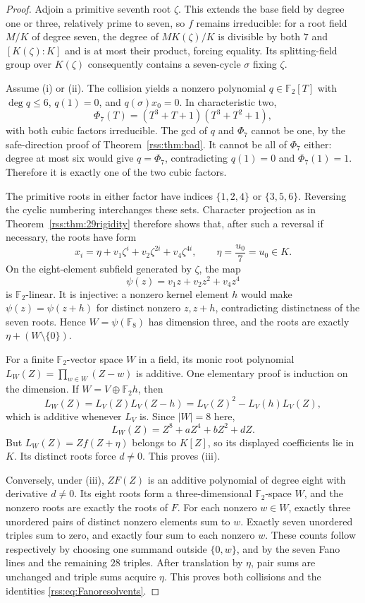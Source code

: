 \documentclass[11pt,a4paper]{article}
\theoremstyle{definition}
\theoremstyle{remark}
\newcommand{\F}{\mathbb F}
\begin{document}
\begin{proof}
Adjoin a primitive seventh root $\zeta$. This extends the base field by
degree one or three, relatively prime to seven, so $f$ remains
irreducible: for a root field $M/K$ of degree seven, the degree of
$M K(\zeta)/K$ is divisible by both $7$ and $[K(\zeta):K]$ and is at most
their product, forcing equality. Its splitting-field group over
$K(\zeta)$ consequently contains a seven-cycle $\sigma$ fixing $\zeta$.

Assume (i) or (ii). The collision yields a nonzero polynomial
$q\in\F_2[T]$ with $\deg q\leq6$, $q(1)=0$, and
$q(\sigma)x_0=0$. In characteristic two,
\[
 \Phi_7(T)=(T^3+T+1)(T^3+T^2+1),
\]
with both cubic factors irreducible. The gcd of $q$ and $\Phi_7$ cannot
be one, by the safe-direction proof of Theorem~\ref{rss:thm:bad}. It cannot
be all of $\Phi_7$ either: degree at most six would give $q=\Phi_7$,
contradicting $q(1)=0$ and $\Phi_7(1)=1$. Therefore it is exactly one of
the two cubic factors.

The primitive roots in either factor have indices
$\{1,2,4\}$ or $\{3,5,6\}$. Reversing the cyclic numbering interchanges
these sets. Character projection as in Theorem~\ref{rss:thm:29rigidity}
therefore shows that, after such a reversal if necessary, the roots have
form
\[
 x_i=\eta+v_1\zeta^i+v_2\zeta^{2i}+v_4\zeta^{4i},
 \qquad \eta=\frac{u_0}{7}=u_0\in K.
\]
On the eight-element subfield generated by $\zeta$, the map
\[
 \psi(z)=v_1z+v_2z^2+v_4z^4
\]
is $\F_2$-linear. It is injective: a nonzero kernel element $h$ would
make $\psi(z)=\psi(z+h)$ for distinct nonzero $z,z+h$, contradicting
distinctness of the seven roots. Hence $W=\psi(\F_8)$ has dimension three,
and the roots are exactly $\eta+(W\setminus\{0\})$.

For a finite $\F_2$-vector space $W$ in a field, its monic root polynomial
$L_W(Z)=\prod_{w\in W}(Z-w)$ is additive. One elementary proof is induction
on the dimension. If $W=V\oplus\F_2 h$, then
\[
 L_W(Z)=L_V(Z)L_V(Z-h)
       =L_V(Z)^2-L_V(h)L_V(Z),
\]
which is additive whenever $L_V$ is. Since $|W|=8$ here,
\[
 L_W(Z)=Z^8+aZ^4+bZ^2+dZ.
\]
But $L_W(Z)=Zf(Z+\eta)$ belongs to $K[Z]$, so its displayed coefficients
lie in $K$. Its distinct roots force $d\neq0$. This proves (iii).

Conversely, under (iii), $ZF(Z)$ is an additive polynomial of degree eight
with derivative $d\neq0$. Its eight roots form a three-dimensional
$\F_2$-space $W$, and the nonzero roots are exactly the roots of $F$.
For each nonzero $w\in W$, exactly three unordered pairs of distinct
nonzero elements sum to $w$. Exactly seven unordered triples sum to zero,
and exactly four sum to each nonzero $w$. These counts follow respectively
by choosing one summand outside $\{0,w\}$, and by the seven Fano lines
and the remaining $28$ triples. After translation by $\eta$, pair sums
are unchanged and triple sums acquire $\eta$. This proves both collisions
and the identities \eqref{rss:eq:Fanoresolvents}.


\end{proof}
\end{document}
